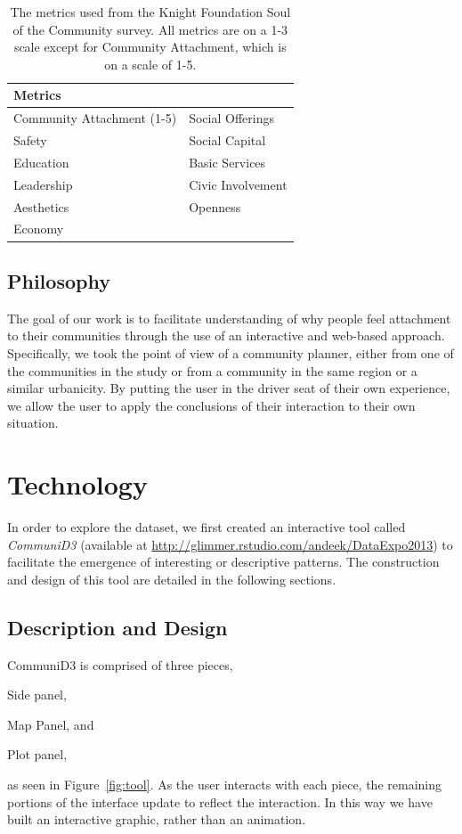\documentclass[11pt]{article}\usepackage{knitr}
\begin{document}
\begin{table}[H]
\centering
\begin{tabular}{l l}
\hline
Metrics & \\
\hline
Community Attachment (1-5) & Social Offerings \\
Safety & Social Capital \\
Education & Basic Services \\
Leadership & Civic Involvement \\
Aesthetics & Openness \\
Economy &  \\
\hline
\end{tabular}
\caption{\label{tab:metrics} The metrics used from the Knight Foundation Soul of the Community survey. All metrics are on a 1-3 scale except for Community Attachment, which is on a scale of 1-5.}
\end{table}

\subsection*{Philosophy}
The goal of our work is to facilitate understanding of why people feel attachment to their communities through the use of an interactive and web-based approach. Specifically, we took the point of view of a community planner, either from one of the communities in the study or from a community in the same region or a similar urbanicity. By putting the user in the driver seat of their own experience, we allow the user to apply the conclusions of their interaction to their own situation.


\section*{Technology}

In order to explore the dataset, we first created an interactive tool called {\it CommuniD3} (available at \url{http://glimmer.rstudio.com/andeek/DataExpo2013}) to facilitate the emergence of interesting or descriptive patterns. The construction and design of this tool are detailed in the following sections.

\subsection*{Description and Design}
CommuniD3 is comprised of three pieces, \begin{inparaenum}[(1)]
\item Side panel, 
\item Map Panel, and
\item Plot panel,
\end{inparaenum}
as seen in Figure~\ref{fig:tool}.
As the user interacts with each piece, the remaining portions of the interface update to reflect the interaction. In this way we have built an interactive graphic, rather than an animation.
\end{document}
